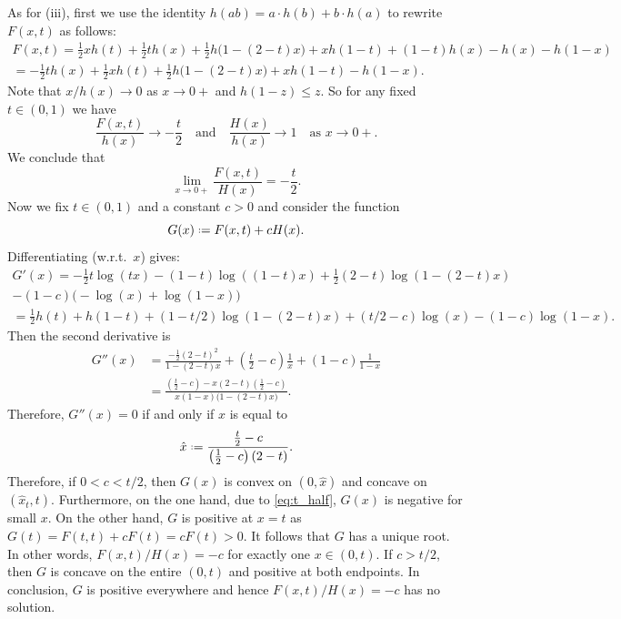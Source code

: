 \documentclass[12pt]{amsart}
\theoremstyle{definition}
\newcommand{\defeq}{\mathrel{\vcenter{\baselineskip0.5ex \lineskiplimit0pt
                     \hbox{\scriptsize.}\hbox{\scriptsize.}}}%
                     =}
\begin{document}
As for (iii), first we use the identity $h(ab)=a \cdot h(b) + b \cdot h(a)$ to rewrite $F(x,t)$ as follows:
%
\begin{multline*}
F(x,t) = \frac12 x h(t) + \frac12 t h(x) 
+ \frac12 h\big( 1-(2-t)x \big) 
+ x h(1-t) + (1-t)h(x) -h(x) - h(1-x) \\
= -\frac12 t h(x) + \frac12 x h(t)
+ \frac12 h\big( 1-(2-t)x \big) + x h(1-t) - h(1-x) .
\end{multline*} 
%
Note that $x / h(x) \to 0$ as $x \to 0+$ and $h(1-z)\leq z$. So for any fixed $t \in (0,1)$ we have  
%
\[ \frac{F(x,t)}{h(x)} \to -\frac{t}{2} 
\quad \text{and} \quad 
\frac{H(x)}{h(x)} \to 1 
\quad \text{as } x \to 0+ .\]
%
We conclude that 
%
\begin{equation} \label{eq:t_half}
\lim_{x \to 0+} \frac{F(x,t)}{H(x)} = -\frac{t}{2} .
\end{equation} 
%
Now we fix $t \in (0,1)$ and a constant $c>0$ and consider the function 
%
\[ G(x) \defeq F(x,t) + c H(x) .\]
%
Differentiating (w.r.t.~$x$) gives:
%
\begin{multline*}
G'(x) = 
-\frac12 t \log(t x) - (1-t)\log( (1-t)x) + \frac12 (2-t)\log(1-(2-t)x) \\
- (1- c) \big( -\log(x) + \log(1-x) \big) \\ 
= \frac12 h(t)+h(1-t) + (1-t/2)\log(1-(2-t)x) 
+ \left(t/2-c \right) \log(x) 
- (1- c) \log(1-x) .
\end{multline*} 
%
Then the second derivative is
%
\begin{align*}
G''(x) &= 
\frac{-\frac12(2-t)^2}{1-(2-t)x} 
+ \left(\frac{t}{2} -c \right) \frac{1}{x} 
+ (1- c) \frac{1}{1-x} \\
&= \frac{ \left( \frac{t}{2} -c \right) 
- x(2-t) \left(\frac12-c\right) }
{x(1-x)\big( 1-(2-t)x \big)}.
\end{align*} 
%
Therefore, $G''(x) = 0$ if and only if $x$ is equal to 
%
\[ \hat{x} \defeq 
\frac{\frac{t}{2}-c}{\left( \frac{1}{2} -c \right) (2-t)} .\]
%
Therefore, if $0<c<t/2$, then $G(x)$ is convex on $(0,\hat{x})$ and concave on $(\hat{x}_t,t)$. Furthermore, on the one hand, due to \eqref{eq:t_half}, $G(x)$ is negative for small $x$. On the other hand, $G$ is positive at $x=t$ as $G(t)=F(t,t)+c F(t)=c F(t) >0$. It follows that $G$ has a unique root. In other words, $F(x,t)/H(x)=-c$ for exactly one $x \in (0,t)$. If $c> t/2$, then $G$ is concave on the entire $(0,t)$ and positive at both endpoints. In conclusion, $G$ is positive everywhere and hence $F(x,t)/H(x)=-c$ has no solution. 
\end{document}
